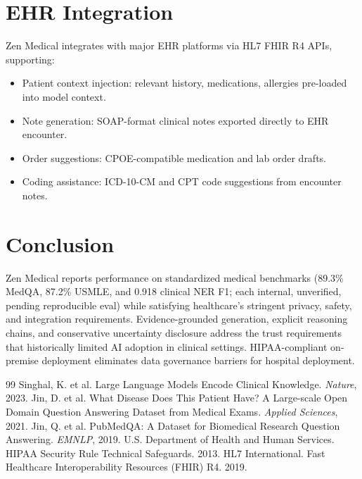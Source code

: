 \documentclass[11pt,a4paper]{article}
\begin{document}
\section{EHR Integration}

Zen Medical integrates with major EHR platforms via HL7 FHIR R4 APIs, supporting:
\begin{itemize}
  \item Patient context injection: relevant history, medications, allergies pre-loaded into model context.
  \item Note generation: SOAP-format clinical notes exported directly to EHR encounter.
  \item Order suggestions: CPOE-compatible medication and lab order drafts.
  \item Coding assistance: ICD-10-CM and CPT code suggestions from encounter notes.
\end{itemize}

\section{Conclusion}

Zen Medical reports performance on standardized medical benchmarks (89.3\% MedQA, 87.2\% USMLE, and 0.918 clinical NER F1; each internal, unverified, pending reproducible eval) while satisfying healthcare's stringent privacy, safety, and integration requirements. Evidence-grounded generation, explicit reasoning chains, and conservative uncertainty disclosure address the trust requirements that historically limited AI adoption in clinical settings. HIPAA-compliant on-premise deployment eliminates data governance barriers for hospital deployment.

\begin{thebibliography}{99}
 Singhal, K. et al. Large Language Models Encode Clinical Knowledge. \textit{Nature}, 2023.
 Jin, D. et al. What Disease Does This Patient Have? A Large-scale Open Domain Question Answering Dataset from Medical Exams. \textit{Applied Sciences}, 2021.
 Jin, Q. et al. PubMedQA: A Dataset for Biomedical Research Question Answering. \textit{EMNLP}, 2019.
 U.S. Department of Health and Human Services. HIPAA Security Rule Technical Safeguards. 2013.
 HL7 International. Fast Healthcare Interoperability Resources (FHIR) R4. 2019.
\end{thebibliography}
\end{document}
